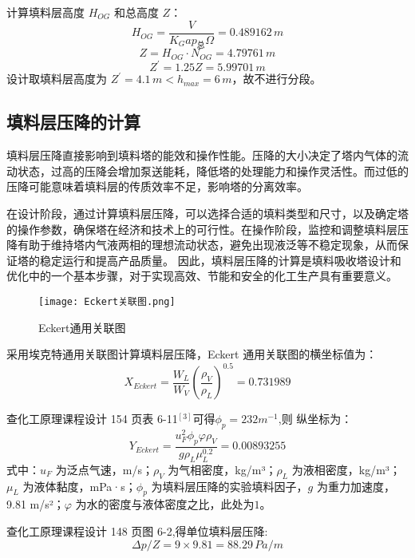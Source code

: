 计算填料层高度 $H_{OG}$ 和总高度 $Z$：
\begin{equation}
	H_{OG} = \frac{V}{K_{G}a p_{总} \Omega} = 0.489162 \, m
\end{equation}
\begin{equation}
	Z = H_{OG} \cdot N_{OG} = 4.79761 \, m
\end{equation}
\begin{equation}
	Z^{\prime} = 1.25Z = 5.99701 \, m
\end{equation}
设计取填料层高度为 $Z^{\prime} = 4.1 \, m < h_{max} = 6 \, m$，故不进行分段。

\subsection{填料层压降的计算}
填料层压降直接影响到填料塔的能效和操作性能。压降的大小决定了塔内气体的流动状态，过高的压降会增加泵送能耗，降低塔的处理能力和操作灵活性。而过低的压降可能意味着填料层的传质效率不足，影响塔的分离效率。

在设计阶段，通过计算填料层压降，可以选择合适的填料类型和尺寸，以及确定塔的操作参数，确保塔在经济和技术上的可行性。在操作阶段，监控和调整填料层压降有助于维持塔内气液两相的理想流动状态，避免出现液泛等不稳定现象，从而保证塔的稳定运行和提高产品质量。 因此，填料层压降的计算是填料吸收塔设计和优化中的一个基本步骤，对于实现高效、节能和安全的化工生产具有重要意义。

\begin{figure}[h]
	\centering
	\texttt{[image: Eckert关联图.png]}
	\caption{Eckert通用关联图}
\end{figure}

采用埃克特通用关联图计算填料层压降，Eckert 通用关联图的横坐标值为：
\begin{equation}
	X_{Eckert} = \frac{W_{L}}{W_{V}} \left( \frac{\rho_{V}}{\rho_{L}} \right)^{0.5} = 0.731989
\end{equation}

查化工原理课程设计 154 页表 6-11$^{[3]}$可得$\phi_{p}=232m^{-1}$,则
纵坐标为：
\begin{equation}
	Y_{Eckert} = \frac{u_F^2 \phi_{p} \varphi \rho_{V}}{g \rho_{L} \mu_{L}^{0.2}} = 0.00893255
\end{equation}
式中：$u_F$ 为泛点气速，m/s；$\rho_{V}$ 为气相密度，kg/m³；$\rho_{L}$ 为液相密度，kg/m³；$\mu_{L}$ 为液体黏度，mPa·s；$\phi_{p}$ 为填料层压降的实验填料因子，$g$ 为重力加速度，9.81 m/s²；$\varphi$ 为水的密度与液体密度之比，此处为$1$。

查化工原理课程设计 148 页图 6-2,得单位填料层压降:
\begin{equation}
	\Delta p/Z = 9 \times 9.81 = 88.29 \, Pa/m
\end{equation}

